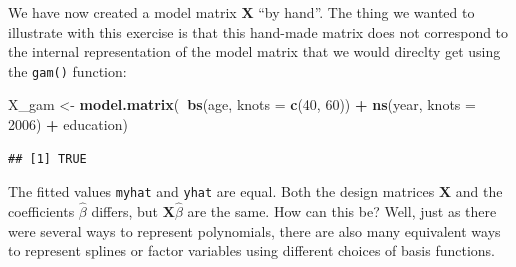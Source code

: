 \documentclass[]{article}
\newenvironment{Shaded}{\begin{snugshade}}{\end{snugshade}}
\newcommand{\CommentTok}[1]{\textcolor[rgb]{0.56,0.35,0.01}{\textit{#1}}}
\newcommand{\DataTypeTok}[1]{\textcolor[rgb]{0.13,0.29,0.53}{#1}}
\newcommand{\DecValTok}[1]{\textcolor[rgb]{0.00,0.00,0.81}{#1}}
\newcommand{\KeywordTok}[1]{\textcolor[rgb]{0.13,0.29,0.53}{\textbf{#1}}}
\newcommand{\NormalTok}[1]{#1}
\newcommand{\OperatorTok}[1]{\textcolor[rgb]{0.81,0.36,0.00}{\textbf{#1}}}
\newcommand{\StringTok}[1]{\textcolor[rgb]{0.31,0.60,0.02}{#1}}
\begin{document}
We have now created a model matrix \(\mathbf X\) ``by hand''. The thing
we wanted to illustrate with this exercise is that this hand-made matrix
does not correspond to the internal representation of the model matrix
that we would direclty get using the \texttt{gam()} function:

\begin{Shaded}
\begin{Highlighting}[]
\NormalTok{X_gam <-}\StringTok{ }\KeywordTok{model.matrix}\NormalTok{(}\OperatorTok{~}\KeywordTok{bs}\NormalTok{(age, }\DataTypeTok{knots =} \KeywordTok{c}\NormalTok{(}\DecValTok{40}\NormalTok{, }\DecValTok{60}\NormalTok{)) }\OperatorTok{+}\StringTok{ }\KeywordTok{ns}\NormalTok{(year, }\DataTypeTok{knots =} \DecValTok{2006}\NormalTok{) }\OperatorTok{+}\StringTok{ }
\StringTok{    }\NormalTok{education)}
\end{Highlighting}
\end{Shaded}

\begin{Shaded}
\end{Shaded}

\begin{verbatim}
## [1] TRUE
\end{verbatim}

The fitted values \texttt{myhat} and \texttt{yhat} are equal. Both the
design matrices \(\mathbf X\) and the coefficients \(\hat{\beta}\)
differs, but \(\mathbf X \hat{\beta}\) are the same. How can this be?
Well, just as there were several ways to represent polynomials, there
are also many equivalent ways to represent splines or factor variables
using different choices of basis functions.
\end{document}
